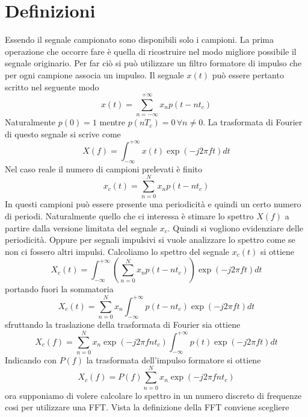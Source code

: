 \documentclass[10pt,a4paper]{book}
\begin{document}
\section{Definizioni}
Essendo il segnale campionato sono disponibili solo i campioni. La prima operazione che occorre fare è quella di ricostruire nel modo migliore possibile il segnale originario. 
Per far ciò si può utilizzare un filtro formatore di impulso che per ogni campione associa un impulso. 
Il segnale $x(t)$ può essere pertanto scritto nel seguente modo
\begin{equation}
x(t) = \sum_{n = -\infty}^{+\infty} x_n p(t-n t_c)
\end{equation}
Naturalmente $p(0) = 1$ mentre $p(n T_c) = 0 \,\forall n \neq 0$.
La trasformata di Fourier di questo segnale si scrive come 
\begin{equation}
X(f) = \int_{-\infty}^{+\infty} x(t) \exp(-j 2 \pi f t) dt
\end{equation}
Nel caso reale il numero di campioni prelevati è finito 
\begin{equation}
x_c(t) = \sum_{n = 0}^{N} x_n p(t-n t_c)
\end{equation}
In questi campioni può essere presente una periodicità e quindi un certo numero di periodi. Naturalmente quello che ci interessa è stimare lo spettro $X(f)$ a partire dalla versione limitata del segnale $x_c$. Quindi si vogliono evidenziare delle periodicità. Oppure per segnali impulsivi si vuole analizzare lo spettro come se non ci fossero altri impulsi.
Calcoliamo lo spettro del segnale $x_c(t)$ si ottiene 
\begin{equation}
X_c(t) = \int_{-\infty}^{+\infty} \left(\sum_{n = 0}^{N} x_n p(t-n t_c)\right) \exp(-j 2 \pi f t) dt
\end{equation}
portando fuori la sommatoria 
\begin{equation}
X_c(t) = \sum_{n = 0}^{N} x_n \int_{-\infty}^{+\infty} p(t-n t_c) \exp(-j 2 \pi f t) dt
\end{equation}
sfruttando la traslazione della trasformata di Fourier sia ottiene 
\begin{equation}
X_c(f) = \sum_{n = 0}^{N} x_n \exp(-j 2 \pi f n t_c)\int_{-\infty}^{+\infty} p(t) \exp(-j 2 \pi f t) dt
\end{equation}
Indicando con $P(f)$ la trasformata dell'impulso formatore si ottiene
\begin{equation}
X_c(f) = P(f)\sum_{n = 0}^{N} x_n \exp(-j 2 \pi f n t_c)
\end{equation}
ora supponiamo di volere calcolare  lo spettro in un numero discreto di frequenze cosi per utilizzare una FFT. Vista la definizione della FFT conviene scegliere
\end{document}
